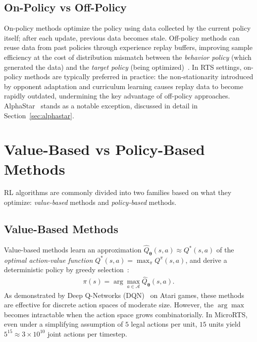 \subsection{On-Policy vs Off-Policy}

On-policy methods optimize the policy using data collected by the current policy itself; after each update, previous data becomes stale. Off-policy methods can reuse data from past policies through experience replay buffers, improving sample efficiency at the cost of distribution mismatch between the \emph{behavior policy} (which generated the data) and 
the \emph{target policy} (being optimized)~\cite{suttonReinforcementLearningIntroduction2020}. In RTS settings, on-policy methods are typically preferred in practice: the non-stationarity introduced by opponent adaptation and curriculum learning causes replay data to become rapidly outdated, undermining the key advantage of off-policy approaches. AlphaStar~\cite{vinyalsGrandmasterLevelStarCraft2019} stands as a notable exception, discussed in detail in Section~\ref{sec:alphastar}.

\section{Value-Based vs Policy-Based Methods}

RL algorithms are commonly divided into two families based on what they optimize: \emph{value-based} methods and \emph{policy-based} methods.

\subsection{Value-Based Methods}

Value-based methods learn an approximation $\hat{Q}_{\boldsymbol{\theta}}(s,a) \approx Q^*(s,a)$ of the \emph{optimal action-value function} $Q^*(s,a) = \max_\pi Q^\pi(s,a)$, and derive a deterministic policy by greedy selection~\cite{watkinsQlearning1992}:
\begin{align}
\pi(s) = \arg\max_{a \in \mathcal{A}} \hat{Q}_{\boldsymbol{\theta}}(s,a).
\end{align}
As demonstrated by Deep Q-Networks (DQN)~\cite{mnihHumanlevelControlDeep2015} on Atari games, these methods are effective for discrete action spaces of moderate size. However, the $\arg\max$ becomes intractable when the action space grows combinatorially. In MicroRTS, even under a simplifying assumption of $5$ legal actions per unit, $15$ units yield $5^{15} \approx 3 \times 10^{10}$ joint actions per timestep.

